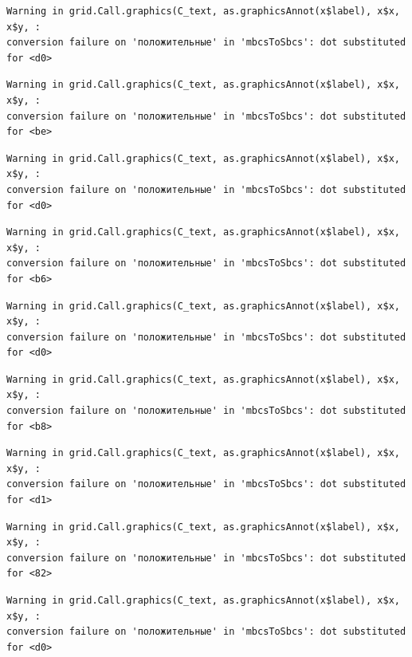 \documentclass[
  letterpaper,
  DIV=11,
  numbers=noendperiod]{scrreprt}
\theoremstyle{definition}
\theoremstyle{remark}
\begin{document}
\begin{verbatim}
Warning in grid.Call.graphics(C_text, as.graphicsAnnot(x$label), x$x, x$y, :
conversion failure on 'положительные' in 'mbcsToSbcs': dot substituted for <d0>
\end{verbatim}

\begin{verbatim}
Warning in grid.Call.graphics(C_text, as.graphicsAnnot(x$label), x$x, x$y, :
conversion failure on 'положительные' in 'mbcsToSbcs': dot substituted for <be>
\end{verbatim}

\begin{verbatim}
Warning in grid.Call.graphics(C_text, as.graphicsAnnot(x$label), x$x, x$y, :
conversion failure on 'положительные' in 'mbcsToSbcs': dot substituted for <d0>
\end{verbatim}

\begin{verbatim}
Warning in grid.Call.graphics(C_text, as.graphicsAnnot(x$label), x$x, x$y, :
conversion failure on 'положительные' in 'mbcsToSbcs': dot substituted for <b6>
\end{verbatim}

\begin{verbatim}
Warning in grid.Call.graphics(C_text, as.graphicsAnnot(x$label), x$x, x$y, :
conversion failure on 'положительные' in 'mbcsToSbcs': dot substituted for <d0>
\end{verbatim}

\begin{verbatim}
Warning in grid.Call.graphics(C_text, as.graphicsAnnot(x$label), x$x, x$y, :
conversion failure on 'положительные' in 'mbcsToSbcs': dot substituted for <b8>
\end{verbatim}

\begin{verbatim}
Warning in grid.Call.graphics(C_text, as.graphicsAnnot(x$label), x$x, x$y, :
conversion failure on 'положительные' in 'mbcsToSbcs': dot substituted for <d1>
\end{verbatim}

\begin{verbatim}
Warning in grid.Call.graphics(C_text, as.graphicsAnnot(x$label), x$x, x$y, :
conversion failure on 'положительные' in 'mbcsToSbcs': dot substituted for <82>
\end{verbatim}

\begin{verbatim}
Warning in grid.Call.graphics(C_text, as.graphicsAnnot(x$label), x$x, x$y, :
conversion failure on 'положительные' in 'mbcsToSbcs': dot substituted for <d0>
\end{verbatim}
\end{document}
